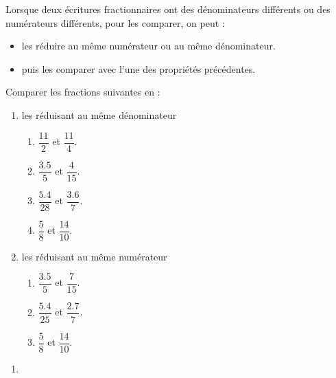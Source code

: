 \begin{methode}
    Lorsque deux écritures fractionnaires ont des dénominateurs différents ou des numérateurs différents, pour les comparer, on peut :
    \begin{itemize}
        \item les réduire au même numérateur ou au même dénominateur.
        \item puis les comparer avec l'une des propriétés précédentes.
    \end{itemize}
    \exercice
    \begin{spacing}{1.5}
        Comparer les fractions suivantes en :
        \begin{enumerate}
            \item les réduisant au même dénominateur
            \begin{enumerate}
                \item $\dfrac{\num{11 }}{\num{2 }}$ et $\dfrac{\num{11 }}{\num{4 }}$.
                \item $\dfrac{\num{3.5}}{\num{5 }}$ et $\dfrac{\num{4  }}{\num{15}}$.
                \item $\dfrac{\num{5.4}}{\num{28}}$ et $\dfrac{\num{3.6}}{\num{7 }}$.
                \item $\dfrac{\num{5  }}{\num{8 }}$ et $\dfrac{\num{14 }}{\num{10}}$.
            \end{enumerate}
            \item les réduisant au même numérateur
            \begin{enumerate}
                \item $\dfrac{\num{3.5}}{\num{5 }}$ et $\dfrac{\num{7  }}{\num{15}}$.
                \item $\dfrac{\num{5.4}}{\num{25}}$ et $\dfrac{\num{2.7}}{\num{7 }}$.
                \item $\dfrac{\num{5  }}{\num{8 }}$ et $\dfrac{\num{14 }}{\num{10}}$.            
            \end{enumerate}
        \end{enumerate}
    \end{spacing}
    \correction
    \begin{spacing}{1.5}
        \begin{enumerate}
            \item 

\end{enumerate}
\end{spacing}
\end{methode}
